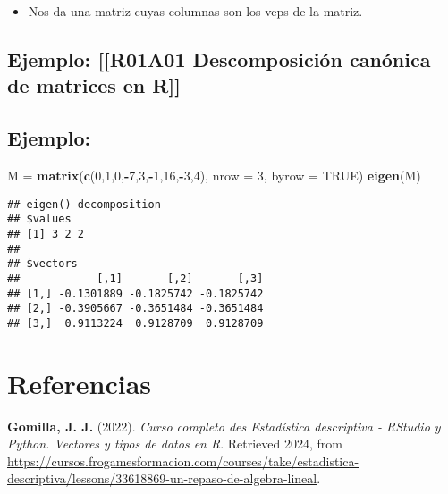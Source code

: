 \documentclass[
]{article}
\newenvironment{Shaded}{\begin{snugshade}}{\end{snugshade}}
\newcommand{\AttributeTok}[1]{\textcolor[rgb]{0.13,0.29,0.53}{#1}}
\newcommand{\ConstantTok}[1]{\textcolor[rgb]{0.56,0.35,0.01}{#1}}
\newcommand{\DecValTok}[1]{\textcolor[rgb]{0.00,0.00,0.81}{#1}}
\newcommand{\FunctionTok}[1]{\textcolor[rgb]{0.13,0.29,0.53}{\textbf{#1}}}
\newcommand{\NormalTok}[1]{#1}
\newcommand{\OtherTok}[1]{\textcolor[rgb]{0.56,0.35,0.01}{#1}}
\newcommand{\SpecialCharTok}[1]{\textcolor[rgb]{0.81,0.36,0.00}{\textbf{#1}}}
\providecommand{\tightlist}{%
  \setlength{\itemsep}{0pt}\setlength{\parskip}{0pt}}
\begin{document}
\begin{itemize}
\tightlist
\item
  Nos da una matriz cuyas columnas son los veps de la matriz.
\end{itemize}

\hypertarget{ejemplo-r01a01-descomposiciuxf3n-canuxf3nica-de-matrices-en-r}{%
\subsection{\texorpdfstring{Ejemplo: {[}{[}\textbf{R01A01}
\textbar Descomposición canónica de matrices en
R{]}{]}}{Ejemplo: {[}{[}R01A01 \textbar Descomposición canónica de matrices en R{]}{]}}}\label{ejemplo-r01a01-descomposiciuxf3n-canuxf3nica-de-matrices-en-r}}

\hypertarget{ejemplo}{%
\subsection{Ejemplo:}\label{ejemplo}}

\begin{Shaded}
\begin{Highlighting}[]
\NormalTok{M }\OtherTok{=} \FunctionTok{matrix}\NormalTok{(}\FunctionTok{c}\NormalTok{(}\DecValTok{0}\NormalTok{,}\DecValTok{1}\NormalTok{,}\DecValTok{0}\NormalTok{,}\SpecialCharTok{{-}}\DecValTok{7}\NormalTok{,}\DecValTok{3}\NormalTok{,}\SpecialCharTok{{-}}\DecValTok{1}\NormalTok{,}\DecValTok{16}\NormalTok{,}\SpecialCharTok{{-}}\DecValTok{3}\NormalTok{,}\DecValTok{4}\NormalTok{), }\AttributeTok{nrow =} \DecValTok{3}\NormalTok{, }\AttributeTok{byrow =} \ConstantTok{TRUE}\NormalTok{)}
\FunctionTok{eigen}\NormalTok{(M)}
\end{Highlighting}
\end{Shaded}

\begin{verbatim}
## eigen() decomposition
## $values
## [1] 3 2 2
## 
## $vectors
##            [,1]       [,2]       [,3]
## [1,] -0.1301889 -0.1825742 -0.1825742
## [2,] -0.3905667 -0.3651484 -0.3651484
## [3,]  0.9113224  0.9128709  0.9128709
\end{verbatim}

\pagebreak

\hypertarget{referencias}{%
\section{Referencias}\label{referencias}}

\textbf{Gomilla, J. J.} (2022). \emph{Curso completo des Estadística
descriptiva - RStudio y Python. Vectores y tipos de datos en R}.
Retrieved 2024, from
\url{https://cursos.frogamesformacion.com/courses/take/estadistica-descriptiva/lessons/33618869-un-repaso-de-algebra-lineal}.
\end{document}
